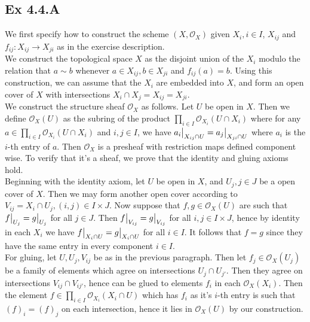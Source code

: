 \documentclass{article}
\newcommand\restr[2]{{%
  \left.\kern-\nulldelimiterspace %
  #1 %
  \vphantom{\big|} %
  \right|_{#2} %
  }}
\theoremstyle{definition}
\newcommand{\oo}{\mathcal{O}}
\begin{document}
\subsection*{Ex 4.4.A}


We first specify how to construct the scheme $(X, \mathcal{O}_X)$ given $X_i, i
	\in I$, $X_{ij}$ and $f_{ij} : X_{ij} \to X_{ji}$ as in the exercise
description. \\

We construct the topological space $X$ as the disjoint union of the $X_i$
modulo the relation that $a \sim b$ whenever $a \in X_{ij}, b \in X_{ji}$ and
$f_{ij}(a) = b$. Using this construction, we can assume that the $X_i$ are
embedded into $X$, and form an open cover of $X$ with intersections $X_i \cap
	X_j = X_{ij} = X_{ji}$. \\

We construct the structure sheaf $\mathcal{O}_{X}$ as follows. Let $U$ be open
in $X$. Then we define $\oo_X(U)$ as the subring of the product $\prod_{i \in
		I} \oo_{X_i}(U \cap X_i)$ where for any $a \in \prod_{i \in I} \oo_{X_i}(U \cap
	X_i)$ and $i, j \in I$, we have $\restr{a_i}{X_{ij} \cap U} = \restr{a_j}{X_{ji} \cap U}$ where
$a_i$ is the $i$-th entry of $a$. Then $\mathcal{O}_X$ is a presheaf with
restriction maps defined component wise. To verify that it's a sheaf, we prove
that the identity and gluing axioms hold. \\

Beginning with the identity axiom, let $U$ be open in $X$, and $U_j, j \in J$
be a open cover of $X$. Then we may form another open cover according to
$V_{ij} = X_i \cap U_j, (i, j) \in I \times J$. Now suppose that $f, g \in
	\mathcal{O}_{X}(U)$ are such that $\restr{f}{U_j} = \restr{g}{U_j}$ for all $j
	\in J$. Then $\restr{f}{V_{ij}} = \restr{g}{V_{ij}}$ for all $i,j \in I \times
	J$, hence by identity in each $X_i$ we have $\restr{f}{X_i \cap U} =
	\restr{g}{X_i \cap U}$ for all $i \in I$. It follows that $f = g$ since they
have the same entry in every component $i \in I$. \\

For gluing, let $U, U_j, V_{ij}$ be as in the previous paragraph. Then let $f_j
	\in \mathcal{O}_X(U_j)$ be a family of elements which agree on intersections
$U_j \cap U_{j'}$. Then they agree on intersections $V_{ij} \cap V_{ij'}$,
hence can be glued to elements $f_i$ in each $\mathcal{O}_X(X_i)$. Then the
element $f \in \prod_{i \in I} \oo_{X_i}(X_i \cap U)$ which has $f_i$ as it's
$i$-th entry is such that $(f)_i = (f)_j$ on each intersection, hence it lies
in $\mathcal{O}_{X}(U)$ by our construction. \\
\end{document}
